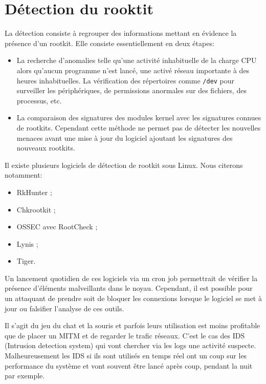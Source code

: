 \documentclass[12pt]{article}
\begin{document}
\section{Détection du rooktit}
    
    La détection consiste à regrouper des informations mettant en évidence la présence d'un rootkit. Elle consiste essentiellement en deux étapes\cite{detection}:
    \begin{itemize}
    	\item La recherche d'anomalies telle qu'une activité inhabituelle de la charge CPU alors qu'aucun programme n'est lancé, une activé réseau importante à des heures inhabituelles. La vérification des répertoires comme \texttt{/dev} pour surveiller les périphériques, de permissions anormales sur des fichiers, des processus, etc.
    	\item La comparaison des signatures des modules kernel avec les signatures connues de rootkits. Cependant cette méthode ne permet pas de détecter les nouvelles menaces avant une mise à jour du logiciel ajoutant les signatures des nouveaux rootkits.
    \end{itemize}
    
    Il existe plusieurs logiciels de détection de rootkit sous Linux. Nous citerons notamment:
    \begin{itemize}
    	\item RkHunter ;
    	\item Chkrootkit ;
    	\item OSSEC avec RootCheck ;
    	\item Lynis ;
    	\item Tiger.
    \end{itemize}
    
    Un lancement quotidien de ces logiciels via un cron job permettrait de vérifier la présence d'éléments malveillants dans le noyau. Cependant, il est possible pour un attaquant de prendre soit de bloquer les connexions lorsque le logiciel se met à jour ou falsifier l'analyse de ces outils. 
    
    Il s'agit du jeu du chat et la souris et parfois leurs utilisation est moins profitable que de placer un MITM et de regarder le trafic réseaux. C'est le cas des IDS (Intrusion detection system) qui vont chercher via les logs une activité suspecte\cite{honeypot}. Malheureusement les IDS si ils sont utilisés en temps réel ont un coup sur les performance du système et vont souvent être lancé après coup, pendant la nuit par exemple. \\
    
\end{document}
